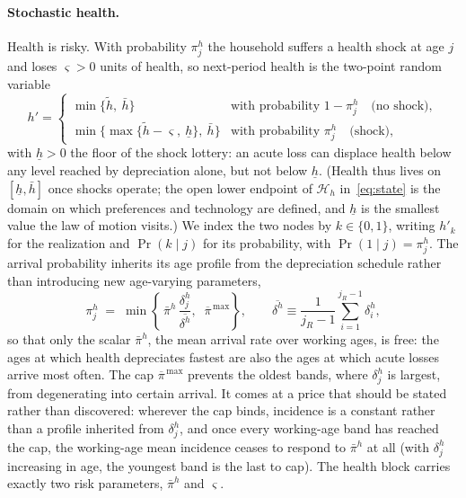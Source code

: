 \documentclass[12pt,a4paper]{article}
\begin{document}
\paragraph{Stochastic health.}
Health is risky. With probability $\pi^h_j$ the household suffers a health shock at age $j$ and loses $\varsigma > 0$ units of health, so next-period health is the two-point random variable
\begin{equation}
\label{eq:health_lom_shock}
h' =
\begin{cases}
\min\{\tilde h,\ \bar h\}
  & \text{with probability } 1 - \pi^h_j \quad \text{(no shock)},\\[4pt]
\min\bigl\{\max\{\tilde h - \varsigma,\ \underline h\},\ \bar h\bigr\}
  & \text{with probability } \pi^h_j \quad \text{(shock)},
\end{cases}
\end{equation}
with $\underline h > 0$ the floor of the shock lottery: an acute loss can
displace health below any level reached by depreciation alone, but not below
$\underline h$. (Health thus lives on $[\underline h, \bar h]$ once shocks
operate; the open lower endpoint of $\mathcal{H}_h$ in~\eqref{eq:state} is the
domain on which preferences and technology are defined, and $\underline h$ is
the smallest value the law of motion visits.) We index the two nodes by $k \in \{0,1\}$, writing $h'_k$ for the realization and $\Pr(k \mid j)$ for its probability, with $\Pr(1 \mid j) = \pi^h_j$. The arrival probability inherits its age profile from the depreciation schedule rather than introducing new age-varying parameters,
\begin{equation}
\label{eq:shock_prob}
\pi^h_j \;=\; \min\!\left\{\,\bar\pi^h\,
   \frac{\delta^h_j}{\overline{\delta^h}}, \;\; \overline{\pi}^{\,\max} \right\},
\qquad
\overline{\delta^h} \equiv \frac{1}{j_R-1}\sum_{i=1}^{j_R-1} \delta^h_i ,
\end{equation}
so that only the scalar $\bar\pi^h$, the mean arrival rate over working ages, is free: the ages at which health depreciates fastest are also the ages at which acute losses arrive most often. The cap $\overline{\pi}^{\,\max}$ prevents the oldest bands, where $\delta^h_j$ is largest, from degenerating into certain arrival. It comes at a price that should be stated rather than discovered: wherever the cap binds, incidence is a constant rather than a profile inherited from $\delta^h_j$, and once every working-age band has reached the cap, the working-age mean incidence ceases to respond to $\bar\pi^h$ at all (with $\delta^h_j$ increasing in age, the youngest band is the last to cap). The health block carries exactly two risk parameters, $\bar\pi^h$ and $\varsigma$.
\end{document}
